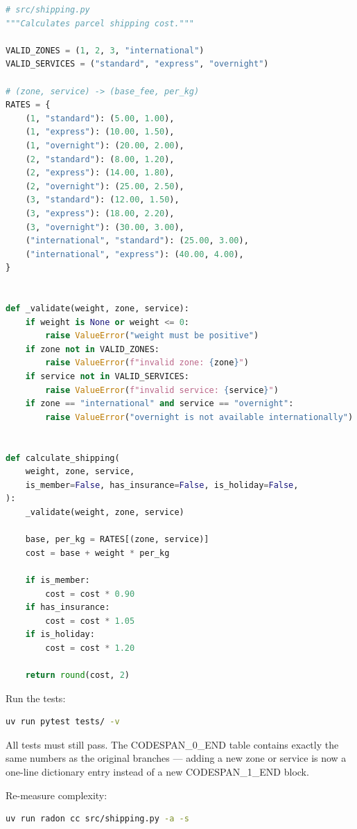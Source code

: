 \documentclass[11pt,a4paper]{book}
\begin{document}
\begin{lstlisting}[language=Python]
# src/shipping.py
"""Calculates parcel shipping cost."""

VALID_ZONES = (1, 2, 3, "international")
VALID_SERVICES = ("standard", "express", "overnight")

# (zone, service) -> (base_fee, per_kg)
RATES = {
    (1, "standard"): (5.00, 1.00),
    (1, "express"): (10.00, 1.50),
    (1, "overnight"): (20.00, 2.00),
    (2, "standard"): (8.00, 1.20),
    (2, "express"): (14.00, 1.80),
    (2, "overnight"): (25.00, 2.50),
    (3, "standard"): (12.00, 1.50),
    (3, "express"): (18.00, 2.20),
    (3, "overnight"): (30.00, 3.00),
    ("international", "standard"): (25.00, 3.00),
    ("international", "express"): (40.00, 4.00),
}


def _validate(weight, zone, service):
    if weight is None or weight <= 0:
        raise ValueError("weight must be positive")
    if zone not in VALID_ZONES:
        raise ValueError(f"invalid zone: {zone}")
    if service not in VALID_SERVICES:
        raise ValueError(f"invalid service: {service}")
    if zone == "international" and service == "overnight":
        raise ValueError("overnight is not available internationally")


def calculate_shipping(
    weight, zone, service,
    is_member=False, has_insurance=False, is_holiday=False,
):
    _validate(weight, zone, service)

    base, per_kg = RATES[(zone, service)]
    cost = base + weight * per_kg

    if is_member:
        cost = cost * 0.90
    if has_insurance:
        cost = cost * 1.05
    if is_holiday:
        cost = cost * 1.20

    return round(cost, 2)
\end{lstlisting}

Run the tests:

\begin{lstlisting}[language=Bash]
uv run pytest tests/ -v
\end{lstlisting}

All tests must still pass. The CODESPAN\_0\_END table contains exactly the same numbers as the original branches --- adding a new zone or service is now a one-line dictionary entry instead of a new CODESPAN\_1\_END block.

Re-measure complexity:

\begin{lstlisting}[language=Bash]
uv run radon cc src/shipping.py -a -s
\end{lstlisting}
\end{document}

